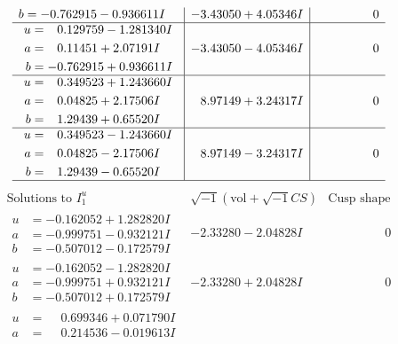 \documentclass[1p]{elsarticle_modified}
\theoremstyle{definition}
\newcommand{\I}{\sqrt{-1}}
\begin{document}
$$\begin{array}{c|c|c}
\begin{aligned}
b &= -0.762915 - 0.936611 I\end{aligned}
 & -3.43050 + 4.05346 I & \phantom{-0.000000 } 0 \\ \hline\begin{aligned}
u &= \phantom{-}0.129759 - 1.281340 I \\
a &= \phantom{-}0.11451 + 2.07191 I \\
b &= -0.762915 + 0.936611 I\end{aligned}
 & -3.43050 - 4.05346 I & \phantom{-0.000000 } 0 \\ \hline\begin{aligned}
u &= \phantom{-}0.349523 + 1.243660 I \\
a &= \phantom{-}0.04825 + 2.17506 I \\
b &= \phantom{-}1.29439 + 0.65520 I\end{aligned}
 & \phantom{-}8.97149 + 3.24317 I & \phantom{-0.000000 } 0 \\ \hline\begin{aligned}
u &= \phantom{-}0.349523 - 1.243660 I \\
a &= \phantom{-}0.04825 - 2.17506 I \\
b &= \phantom{-}1.29439 - 0.65520 I\end{aligned}
 & \phantom{-}8.97149 - 3.24317 I & \phantom{-0.000000 } 0\\
 \hline 
 \end{array}$$\newpage$$\begin{array}{c|c|c}  
\text{Solutions to }I^u_{1}& \I (\text{vol} + \sqrt{-1}CS) & \text{Cusp shape}\\
 \hline 
\begin{aligned}
u &= -0.162052 + 1.282820 I \\
a &= -0.999751 - 0.932121 I \\
b &= -0.507012 - 0.172579 I\end{aligned}
 & -2.33280 - 2.04828 I & \phantom{-0.000000 } 0 \\ \hline\begin{aligned}
u &= -0.162052 - 1.282820 I \\
a &= -0.999751 + 0.932121 I \\
b &= -0.507012 + 0.172579 I\end{aligned}
 & -2.33280 + 2.04828 I & \phantom{-0.000000 } 0 \\ \hline\begin{aligned}
u &= \phantom{-}0.699346 + 0.071790 I \\
a &= \phantom{-}0.214536 - 0.019613 I \\

\end{aligned}
\end{array}$$
\end{document}
